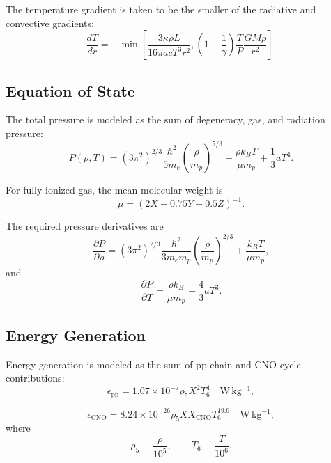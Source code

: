 \documentclass[12pt]{article}
\begin{document}
The temperature gradient is taken to be the smaller of the radiative and convective gradients:
\begin{equation}
\frac{dT}{dr}
=
-\min\left[
\frac{3\kappa\rho L}{16\pi a c T^3 r^2},
\left(1-\frac{1}{\gamma}\right)\frac{T}{P}\frac{GM\rho}{r^2}
\right].
\label{eq:dTdr}
\end{equation}

\subsection{Equation of State}

The total pressure is modeled as the sum of degeneracy, gas, and radiation pressure:
\begin{equation}
P(\rho,T)
=
(3\pi^2)^{2/3}\frac{\hbar^2}{5m_e}\left(\frac{\rho}{m_p}\right)^{5/3}
+
\frac{\rho k_B T}{\mu m_p}
+
\frac{1}{3}aT^4.
\label{eq:eos}
\end{equation}

For fully ionized gas, the mean molecular weight is
\begin{equation}
\mu = \left(2X+0.75Y+0.5Z\right)^{-1}.
\end{equation}

The required pressure derivatives are
\begin{equation}
\frac{\partial P}{\partial \rho}
=
(3\pi^2)^{2/3}\frac{\hbar^2}{3m_e m_p}\left(\frac{\rho}{m_p}\right)^{2/3}
+
\frac{k_B T}{\mu m_p},
\end{equation}
and
\begin{equation}
\frac{\partial P}{\partial T}
=
\frac{\rho k_B}{\mu m_p}
+
\frac{4}{3}aT^3.
\end{equation}

\subsection{Energy Generation}

Energy generation is modeled as the sum of pp-chain and CNO-cycle contributions:
\begin{equation}
\epsilon_{\mathrm{pp}}
=
1.07\times10^{-7}\rho_5 X^2 T_6^4
\quad \mathrm{W\,kg^{-1}},
\end{equation}

\begin{equation}
\epsilon_{\mathrm{CNO}}
=
8.24\times10^{-26}\rho_5 X X_{\mathrm{CNO}} T_6^{19.9}
\quad \mathrm{W\,kg^{-1}},
\end{equation}
where
\begin{equation}
\rho_5 \equiv \frac{\rho}{10^5},
\qquad
T_6 \equiv \frac{T}{10^6}.
\end{equation}
\end{document}
